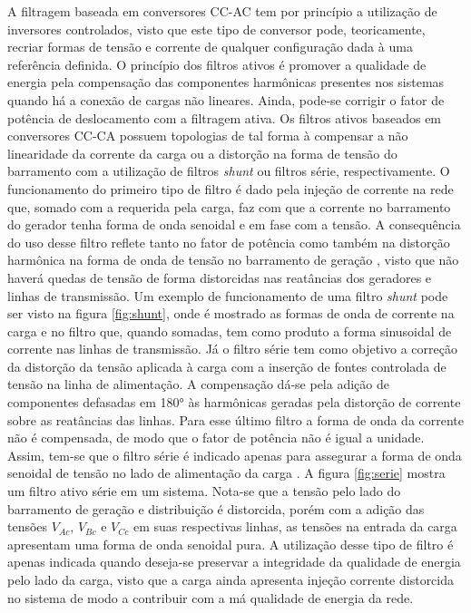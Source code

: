 A filtragem baseada em conversores CC-AC tem por princípio a utilização de inversores controlados, visto que este tipo de conversor pode, teoricamente, recriar formas de tensão e corrente de qualquer configuração dada à uma referência definida\cite{Pomilio2009}. O princípio dos filtros ativos é promover a qualidade de energia pela compensação das componentes harmônicas presentes nos sistemas quando há a conexão de cargas não lineares. Ainda, pode-se corrigir o fator de potência de deslocamento com a filtragem ativa. Os filtros ativos baseados em conversores CC-CA possuem topologias de tal forma à compensar a não linearidade da corrente da carga ou a distorção na forma de tensão do barramento com a utilização de filtros \textit{shunt} ou filtros série, respectivamente. O funcionamento do primeiro tipo de filtro é dado pela injeção de corrente na rede que, somado com a requerida pela carga, faz com que a corrente no barramento do gerador tenha forma de onda senoidal e em fase com a tensão. A consequência do uso desse filtro reflete tanto no fator de potência como também na distorção harmônica na forma de onda de tensão no barramento de geração \cite{Afonso2013}, visto que não haverá quedas de tensão de forma distorcidas nas reatâncias dos geradores e linhas de transmissão. Um exemplo de funcionamento de uma filtro \textit{shunt} pode ser visto na figura \ref{fig:shunt}, onde é mostrado as formas de onda de corrente na carga e no filtro que, quando somadas, tem como produto a forma sinusoidal de corrente nas linhas de transmissão. Já o filtro série tem como objetivo a correção da distorção da tensão aplicada à carga com a inserção de fontes controlada de tensão na linha de alimentação. A compensação dá-se pela adição de componentes defasadas em 180° às harmônicas geradas pela distorção de corrente sobre as reatâncias das linhas. Para esse último filtro a forma de onda da corrente não é compensada, de modo que o fator de potência não é igual a unidade. Assim, tem-se que o filtro série é indicado apenas para assegurar a forma de onda senoidal de tensão no lado de alimentação da carga \cite{Afonso2013}. A figura \ref{fig:serie} mostra um filtro ativo série em um sistema. Nota-se que a tensão pelo lado do barramento de geração e distribuição é distorcida, porém com a adição das tensões $V_{Ac}$, $V_{Bc}$ e $V_{Cc}$ em suas respectivas linhas, as tensões na entrada da carga apresentam uma forma de onda senoidal pura. A utilização desse tipo de filtro é apenas indicada quando deseja-se preservar a integridade da qualidade de energia pelo lado da carga, visto que a carga ainda apresenta injeção corrente distorcida no sistema de modo a contribuir com a má qualidade de energia da rede.

